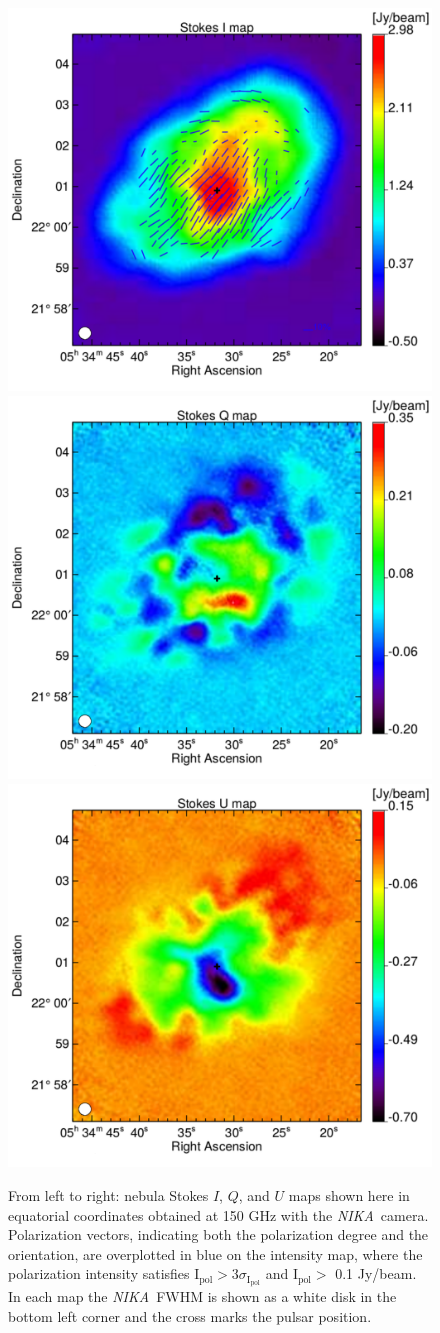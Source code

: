 \documentclass[twocolumn,traditabstract]{aa}
\def\NIKA{\textit{NIKA}}
\begin{document}
\begin{figure}[h!]
  \centering
          { \includegraphics[width=0.32\linewidth,keepaspectratio]{figures/Crab_i_v3.pdf}}      
             { \includegraphics[width=0.32\linewidth,keepaspectratio]{figures/Crab_Q_v3_2mm.pdf}}
          { \includegraphics[width=0.32\linewidth,keepaspectratio]{figures/Crab_U_v3_2mm.pdf}} 
           \caption{From left to right:  nebula Stokes $I$, $Q$, and $U$
             maps shown here in equatorial coordinates obtained at 150 GHz with the \NIKA\ camera. Polarization
             vectors, indicating both the polarization degree and the orientation, are
             overplotted in blue on the intensity map, where the polarization
             intensity satisfies $\textrm{I}_\textrm{pol} > 3 \sigma_{\textrm{I}_\textrm{pol}}$ and $\textrm{I}_\textrm{pol} >$ 0.1 Jy/beam. In each map the \NIKA\ FWHM is shown as a white disk in the bottom left corner and the cross marks the pulsar position.}
\label{crab_intensity_maps}
\end{figure}
\end{document}
